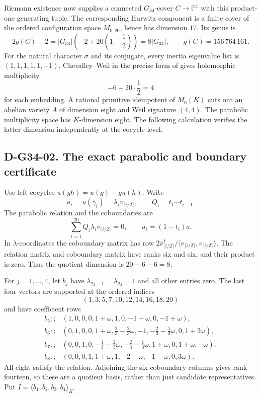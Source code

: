 Riemann existence now supplies a connected \(G_{34}\)-cover
\(C\to\mathbb P^1\) with this product-one generating tuple.  The corresponding
Hurwitz component is a finite cover of the ordered configuration space
\(M_{0,20}\), hence has dimension \(17\).  Its genus is
\[
 2g(C)-2=|G_{34}|\left(-2+20\left(1-\frac12\right)\right)
        =8|G_{34}|,
 \qquad g(C)=156\,764\,161.
\]
For the natural character \(\sigma\) and its conjugate, every inertia
eigenvalue list is \((1,1,1,1,1,-1)\).  Chevalley--Weil in the precise form
of \cite[Theorem 2.10]{G34:FGP} gives holomorphic multiplicity
\[
                         -6+20\cdot\frac12=4
\]
for each embedding.  A rational primitive idempotent of \(M_6(K)\) cuts out
an abelian variety \(A\) of dimension eight and Weil signature \((4,4)\).
The parabolic multiplicity space has \(K\)-dimension eight.  The following
calculation verifies the latter dimension independently at the cocycle level.

\subsection*{D-G34-02. The exact parabolic and boundary certificate}

Use left cocycles \(u(gh)=u(g)+g u(h)\).  Write
\[
 u_i=u(\gamma_i)=\lambda_i v_{\lceil i/2\rceil},\qquad
 Q_i=t_1\cdots t_{i-1}.
\]
The parabolic relation and the coboundaries are
\[
 \sum_{i=1}^{20}Q_i\lambda_i v_{\lceil i/2\rceil}=0,
 \qquad u_i=(1-t_i)a.
\]
In \(\lambda\)-coordinates the coboundary matrix has row
\(2\overline v_{\lceil i/2\rceil}^{\,t}/
\langle v_{\lceil i/2\rceil},v_{\lceil i/2\rceil}\rangle\).
The relation matrix and coboundary matrix have ranks six and six, and their
product is zero.  Thus the quotient dimension is \(20-6-6=8\).

For \(j=1,\ldots,4\), let \(b_j\) have
\(\lambda_{2j-1}=\lambda_{2j}=1\) and all other entries zero.  The last four
vectors are supported at the ordered indices
\[
                       (1,3,5,7,10,12,14,16,18,20)
\]
and have coefficient rows
\[
\begin{aligned}
 b_5:;&(1,0,0,0,1+\omega,1,0,-1-\omega,0,-1+\omega),\\
 b_6:;&(0,1,0,0,1+\omega,\tfrac23-\tfrac23\omega,-1,
                     -\tfrac23-\tfrac13\omega,0,1+2\omega),\\
 b_7:;&(0,0,1,0,-\tfrac13-\tfrac23\omega,-\tfrac23-\tfrac13\omega,
                          1+\omega,0,1+\omega,-\omega),\\
 b_8:;&(0,0,0,1,1+\omega,1,-2-\omega,-1-\omega,0,3\omega).
\end{aligned}
\]
All eight satisfy the relation.  Adjoining the six coboundary columns gives
rank fourteen, so these are a quotient basis, rather than just candidate
representatives.  Put \(I=\langle b_1,b_2,b_3,b_4\rangle_K\).

